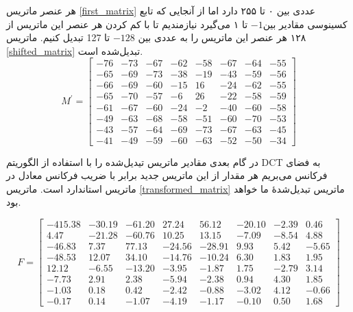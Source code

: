 هر عنصر ماتریس \ref{first_matrix} عددی بین ۰ تا ۲۵۵ دارد اما از آنجایی که تابع کسینوسی 
مقادیر بین$-1$ تا ۱ می‌گیرد نیازمندیم تا با کم کردن هر عنصر این ماتریس از 
۱۲۸ 
هر عنصر این ماتریس را به عددی بین $-128$ تا 127 تبدیل کنیم.
ماتریس   \ref{shifted_matrix} تبدیل‌شده است.
\begin{equation}    
                M^\prime = \begin{bmatrix}
                        -76 & -73 & -67 & -62 & -58 & -67 & -64 & -55\\
                        -65 & -69 & -73 & -38 & -19 & -43 & -59 & -56 \\
                        -66 & -69 & -60 & -15 & 16 & -24 & -62 & -55 \\
                        -65 & -70 & -57 & -6 & 26 & -22 & -58 & -59 \\
                        -61 & -67 & -60 & -24 & -2 & -40 & -60 & -58 \\
                        -49 & -63 & -68 & -58 & -51 & -60 & -70 & -53 \\
                        -43 & -57 & -64 & -69 & -73 & -67 & -63 & -45 \\
                        -41 & -49 & -59 & -60 & -63 & -52 & -50 & -34 
                        
                \end{bmatrix}
                \label{shifted_matrix}
\end{equation}

در گام بعدی مقادیر ماتریس تیدیل‌شده را با استفاده از الگوریتم 
DCT به فضای فرکانس می‌بریم
هر مقدار از این ماتریس جدید برابر با ضریب فرکانس معادل در ماتریس 
استاندارد است. ماتریس \ref{transformed_matrix} ماتریس تبدیل‌شده‌ٔ ما خواهد بود.

\begin{equation}        
        F = \begin{bmatrix}
                -415.38 & -30.19 & -61.20 & 27.24 & 56.12 & -20.10 & -2.39 & 0.46\\
                4.47 & -21.28 & -60.76 & 10.25 & 13.15 & -7.09 & -8.54 & 4.88 \\
                -46.83 & 7.37 & 77.13 & -24.56 & -28.91 & 9.93 & 5.42 & -5.65 \\
                -48.53 & 12.07 & 34.10 & -14.76 & -10.24 & 6.30 & 1.83 & 1.95 \\
                12.12 & -6.55 & -13.20 & -3.95 & -1.87 & 1.75 & -2.79 & 3.14 \\
                -7.73 & 2.91 & 2.38 & -5.94 & -2.38 & 0.94 & 4.30 & 1.85 \\
                -1.03 & 0.18 & 0.42 & -2.42 & -0.88 & -3.02 & 4.12 & -0.66 \\
                -0.17 & 0.14 & -1.07 & -4.19 & -1.17 & -0.10 & 0.50 & 1.68 

        \end{bmatrix}
        \label{transformed_matrix}        
\end{equation}

